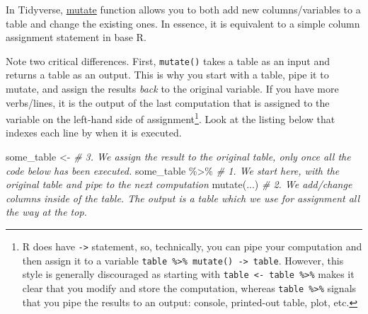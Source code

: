 \documentclass[
]{book}
\newenvironment{Shaded}{\begin{snugshade}}{\end{snugshade}}
\newcommand{\AttributeTok}[1]{\textcolor[rgb]{0.77,0.63,0.00}{#1}}
\newcommand{\CommentTok}[1]{\textcolor[rgb]{0.56,0.35,0.01}{\textit{#1}}}
\newcommand{\DecValTok}[1]{\textcolor[rgb]{0.00,0.00,0.81}{#1}}
\newcommand{\FunctionTok}[1]{\textcolor[rgb]{0.00,0.00,0.00}{#1}}
\newcommand{\NormalTok}[1]{#1}
\newcommand{\OtherTok}[1]{\textcolor[rgb]{0.56,0.35,0.01}{#1}}
\newcommand{\SpecialCharTok}[1]{\textcolor[rgb]{0.00,0.00,0.00}{#1}}
\begin{document}
In Tidyverse, \href{https://dplyr.tidyverse.org/reference/mutate.html}{mutate} function allows you to both add new columns/variables to a table and change the existing ones. In essence, it is equivalent to a simple column assignment statement in base R.

\begin{Shaded}
\end{Shaded}

Note two critical differences. First, \texttt{mutate()} takes a table as an input and returns a table as an output. This is why you start with a table, pipe it to mutate, and assign the results \emph{back} to the original variable. If you have more verbs/lines, it is the output of the last computation that is assigned to the variable on the left-hand side of assignment\footnote{R does have \texttt{-\textgreater{}} statement, so, technically, you can pipe your computation and then assign it to a variable \texttt{table\ \%\textgreater{}\%\ mutate()\ -\textgreater{}\ table}. However, this style is generally discouraged as starting with \texttt{table\ \textless{}-\ table\ \%\textgreater{}\%} makes it clear that you modify and store the computation, whereas \texttt{table\ \%\textgreater{}\%} signals that you pipe the results to an output: console, printed-out table, plot, etc.}. Look at the listing below that indexes each line by when it is executed.

\begin{Shaded}
\begin{Highlighting}[]
\NormalTok{some\_table }\OtherTok{\textless{}{-}}    \CommentTok{\# 3. We assign the result to the original table, only once all the code below has been executed.}
\NormalTok{  some\_table }\SpecialCharTok{\%\textgreater{}\%} \CommentTok{\# 1. We start here, with the original table and pipe to the next computation}
  \FunctionTok{mutate}\NormalTok{(...)    }\CommentTok{\# 2. We add/change columns inside of the table. The output is a table which we use for assignment all the way at the top.}
\end{Highlighting}
\end{Shaded}
\end{document}
